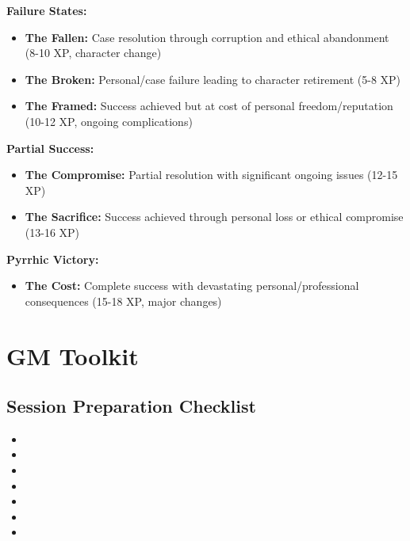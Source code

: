\documentclass[11pt]{article}
\begin{document}
\textbf{Failure States:}
\begin{itemize}
\item \textbf{The Fallen:} Case resolution through corruption and ethical abandonment (8-10 XP, character change)
\item \textbf{The Broken:} Personal/case failure leading to character retirement (5-8 XP)
\item \textbf{The Framed:} Success achieved but at cost of personal freedom/reputation (10-12 XP, ongoing complications)
\end{itemize}

\textbf{Partial Success:}
\begin{itemize}
\item \textbf{The Compromise:} Partial resolution with significant ongoing issues (12-15 XP)
\item \textbf{The Sacrifice:} Success achieved through personal loss or ethical compromise (13-16 XP)
\end{itemize}

\textbf{Pyrrhic Victory:}
\begin{itemize}
\item \textbf{The Cost:} Complete success with devastating personal/professional consequences (15-18 XP, major changes)
\end{itemize}

\section{GM Toolkit}

\subsection{Session Preparation Checklist}

\begin{itemize}
\item {}
\item {}
\item {}
\item {}
\item {}
\item {}
\item {}
\end{itemize}
\end{document}
